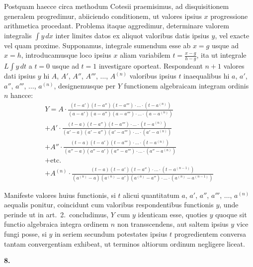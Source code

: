\documentclass[12pt,a4paper]{article}
\newcommand{\art}[1]{\par\medskip\noindent\textbf{#1.}\par\nopagebreak\smallskip}
\begin{document}
Postquam haecce circa methodum Cotesii praemisimus, ad disquisitionem generalem progredimur, abiiciendo conditionem, ut valores ipsius $x$ progressione arithmetica procedant. Problema itaque aggredimur, determinare valorem integralis $\int\!y\,dx$ inter limites datos ex aliquot valoribus datis ipsius $y$, vel exacte vel quam proxime. Supponamus, integrale sumendum esse ab $x=g$ usque ad $x=h$, introducamusque loco ipsius $x$ aliam variabilem $t=\frac{x-g}{h-g}$, ita ut integrale $L\int\!y\,dt$ a $t=0$ usque ad $t=1$ investigare oporteat. Respondeant $n+1$ valores dati ipsius $y$ hi $A$, $A'$, $A''$, $A'''$, $\ldots$, $A^{(n)}$ valoribus ipsius $t$ inaequalibus hi $a$, $a'$, $a''$, $a'''$, $\ldots$, $a^{(n)}$, designemusque per $Y$ functionem algebraicam integram ordinis $n$ hancce:
\begin{multline*}
Y = A\cdot\frac{(t-a')(t-a'')(t-a''')\cdot\ldots\cdot(t-a^{(n)})}{(a-a')(a-a'')(a-a''')\cdot\ldots\cdot(a-a^{(n)})}\\
+ A'\cdot\frac{(t-a)(t-a'')(t-a''')\cdot\ldots\cdot(t-a^{(n)})}{(a'-a)(a'-a'')(a'-a''')\cdot\ldots\cdot(a'-a^{(n)})}\\
+ A''\cdot\frac{(t-a)(t-a')(t-a''')\cdot\ldots\cdot(t-a^{(n)})}{(a''-a)(a''-a')(a''-a''')\cdot\ldots\cdot(a''-a^{(n)})}\\
+ \text{etc.}\\
+ A^{(n)}\cdot\frac{(t-a)(t-a')(t-a'')\cdot\ldots\cdot(t-a^{(n-1)})}{(a^{(n)}-a)(a^{(n)}-a')(a^{(n)}-a'')\cdot\ldots\cdot(a^{(n)}-a^{(n-1)})}
\end{multline*}

Manifeste valores huius functionis, si $t$ alicui quantitatum $a$, $a'$, $a''$, $a'''$, $\ldots$, $a^{(n)}$ aequalis ponitur, coincidunt cum valoribus respondentibus functionis $y$, unde perinde ut in art.\ 2.\ concludimus, $Y$ cum $y$ identicam esse, quoties $y$ quoque sit functio algebraica integra ordinem $n$ non transscendens, aut saltem ipsius $y$ vice fungi posse, si $y$ in seriem secundum potestates ipsius $t$ progredientem conversa tantam convergentiam exhibeat, ut terminos altiorum ordinum negligere liceat.

\art{8}
\end{document}
